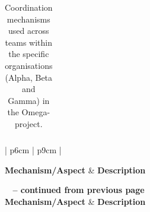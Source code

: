 \begin{center}
\begin{longtable}{| p{6cm} | p{9cm} |}
    \caption{Coordination mechanisms used across teams within the specific organisations (Alpha, Beta and Gamma) in the Omega-project.}
    \label{cmuasito}
    \end{longtable}
\end{center}

\begin{center}
    \begin{longtable}{| p{6cm} | p{9cm} |}
   
    \hline \textbf{Mechanism/Aspect} & \textbf{Description} \\ \hline
    \endfirsthead

{{\bfseries \tablename\ \thetable{} -- continued from previous page}} \\ \hline
    \textbf{Mechanism/Aspect} & \textbf{Description} \\ \hline
    \endhead

     \\ \hline
    \endfoot

   \endlastfoot 


\end{longtable}
\end{center}
